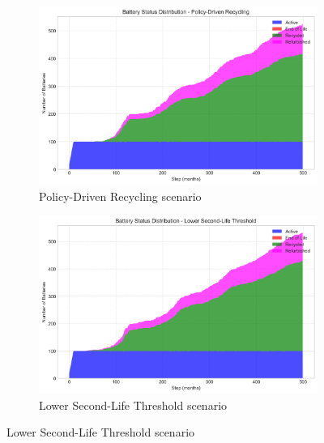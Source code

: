 \begin{figure}[htbp]
\vspace{0.2cm}
\begin{subfigure}{0.42\textwidth}
    \includegraphics[width=\textwidth]{figures/policy-driven_recycling_battery_status.png}
    \caption{Policy-Driven Recycling scenario}
    \label{fig:battery_policy}
\end{subfigure}
\hfill
\begin{subfigure}{0.42\textwidth}
    \includegraphics[width=\textwidth]{figures/lower_second-life_threshold_battery_status.png}
    \caption{Lower Second-Life Threshold scenario}
    \label{fig:battery_lower}
\end{subfigure}


\end{figure}
